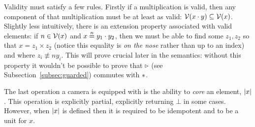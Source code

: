 \documentclass{amsart}
\begin{document}
Validity must satisfy a few rules. Firstly if a multiplication is
valid, then any component of that multiplication must be at least as
valid: $\mathcal{V}(x \mathbin{\cdot} y) \subseteq \mathcal{V}(x)$. Slightly less
intuitively, there is an extension property associated with valid
elements: if $n \in \mathcal{V}(x)$ and $x \mathrel{\stackrel{n}{=}} y_1 \mathbin{\cdot} y_2$, then
we must be able to find some $z_1, z_2$ so that $x = z_1 \times z_2$
(notice this equality is \emph{on the nose} rather than up to an
index) and where $z_i \nequiv{n} y_i$. This will prove crucial later
in the semantics: without this property it wouldn't be possible to
prove that $\mathop{{\triangleright}}$ (see Subsection~\ref{subsec:guarded}) commutes
with $\ast$.

The last operation a camera is equipped with is the ability to
\emph{core} an element, ${\mid}x{\mid}$. This operation is explicitly
partial, explicitly returning $\bot$ in some cases. However, when
${\mid}x{\mid}$ is defined then it is required to be idempotent and to be
a unit for $x$.
\end{document}

